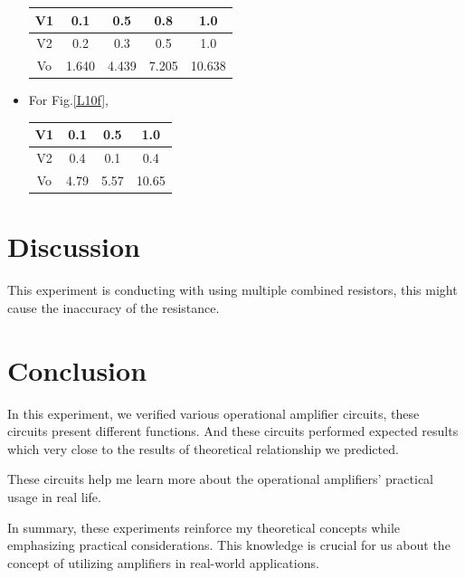 \begin{itemize}
\begin{table}[h]
\centering
\begin{tabular}{|c|c|c|c|c|}
\hline
V1 & 0.1   & 0.5   & 0.8   & 1.0    \\ \hline
V2 & 0.2   & 0.3   & 0.5   & 1.0    \\ \hline
Vo & 1.640 & 4.439 & 7.205 & 10.638 \\ \hline
\end{tabular}
\end{table}
\FloatBarrier
        \item For Fig.\ref{L10f},
\begin{table}[h]
\centering
\begin{tabular}{|c|c|c|c|}
\hline
V1 & 0.1  & 0.5  & 1.0   \\ \hline
V2 & 0.4  & 0.1  & 0.4   \\ \hline
Vo & 4.79 & 5.57 & 10.65 \\ \hline
\end{tabular}
\end{table}
\FloatBarrier
    \end{itemize}
\FloatBarrier
    
\section{Discussion}
This experiment is conducting with using multiple combined resistors, this might cause the inaccuracy of the resistance.

\section{Conclusion}
In this experiment, we verified various operational amplifier circuits, these circuits present different functions. And these circuits performed expected results which very close to the results of theoretical relationship we predicted.\par
These circuits help me learn more about the operational amplifiers' practical usage in real life.\par
In summary, these experiments reinforce my theoretical concepts while emphasizing practical considerations. This knowledge is crucial for us about the concept of utilizing amplifiers in real-world applications.